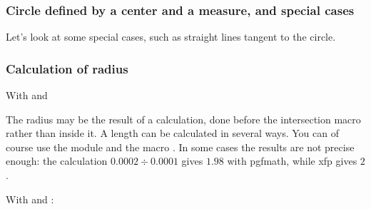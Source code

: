 \subsubsection{Circle defined by a center and a measure, and special cases}
Let's look at some special cases, such as straight lines tangent to the circle.

\begin{tkzexample}[latex=7cm,small]

\end{tkzexample}

\subsubsection{Calculation of radius}
 With  and 

The radius may be the result of a calculation, done before the intersection macro rather than inside it.
A length can be calculated in several ways. You can of course
 use the module  and the macro . In some cases the results are not precise enough: the calculation $0.0002 \div 0.0001$ gives $1.98$ with pgfmath, while xfp gives $2$.

With  and :

\begin{tkzexample}[latex=7cm,small]
  \end{tkzexample}


